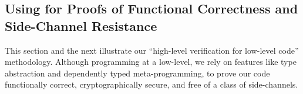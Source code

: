 



\subsection{Using \lowstar for Proofs of Functional Correctness and Side-Channel Resistance}
\label{sec:poly1305}

This section and the next illustrate our ``high-level
verification for low-level code'' methodology.
%
Although programming at a low-level, we rely on features like type
abstraction and dependently typed meta-pro\-gramming, to prove our
code functionally correct, cryptographically secure, and free of a
class of side-channels.

